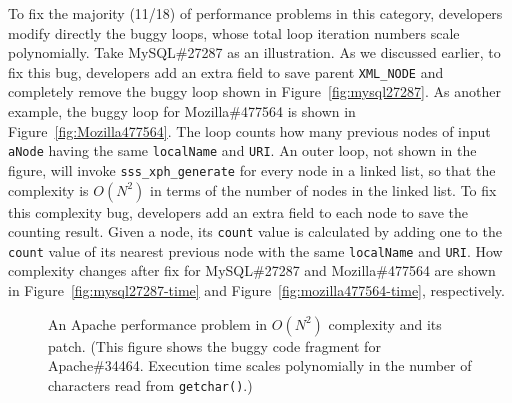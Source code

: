 To fix the majority (11/18) of performance problems in this category,
developers modify directly the buggy loops, 
whose total loop iteration numbers scale polynomially.
Take MySQL\#27287 as an illustration.
As we discussed earlier, to fix this bug,
developers add an extra field to save parent \texttt{XML\_NODE}
and completely remove the buggy loop shown in Figure~\ref{fig:mysql27287}.
As another example, the buggy loop for Mozilla\#477564 is shown in Figure~\ref{fig:Mozilla477564}.
The loop counts how many previous nodes of input \texttt{aNode} 
having the same \texttt{localName} and \texttt{URI}.
An outer loop, not shown in the figure, 
will invoke \texttt{sss\_xph\_generate} for every node in a linked list, 
so that the complexity is $O(N^2)$ in terms of the number of nodes in the linked list.
To fix this complexity bug, developers add an extra field to each node to 
save the counting result. 
Given a node, 
its \texttt{count} value is calculated by adding one 
to the \texttt{count} value of 
its nearest previous node with the same \texttt{localName} and \texttt{URI}.  
How complexity changes after fix for MySQL\#27287 and Mozilla\#477564 are 
shown in Figure~\ref{fig:mysql27287-time} and Figure~\ref{fig:mozilla477564-time}, respectively. 






\begin{figure}
\centering
{}
  \mbox{}
\caption{An Apache performance problem in $O(N^2)$ complexity and its patch. 
\footnotesize{(This figure shows the buggy code fragment for Apache\#34464. 
 Execution time scales polynomially in the number of characters read from \texttt{getchar()}.)}}
\vspace{-0.05in}
\label{fig:apache34464}
\vspace{-0.05in}
\end{figure}







